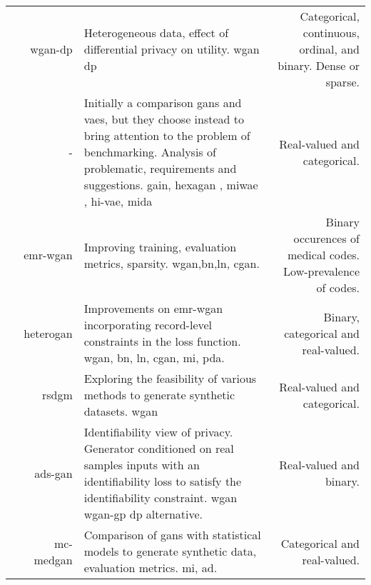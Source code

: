 \begin{center}
\begin{longtable}[l]{@{}p{}NMR@{}}
        \citeauthor{chincheong2020generation} & \gls{wgan-dp}
        & Heterogeneous data, effect of differential privacy on utility.   \gls{wgan} \gls{dp}
        & Categorical, continuous,  ordinal, and binary. Dense or sparse.\\
        
        \citeauthor{Camino2020bench} & - & Initially a comparison \glspl{gan} and \glspl{vae}, but they choose instead to bring attention to the problem of benchmarking. Analysis of problematic,  requirements and suggestions. \gls{gain}, \gls{hexagan} \cite{hwang2019exagan}, \gls{miwae} \cite{mattei2019miwae}, \gls{hi-vae}\cite{nazabal2020handling}, \gls{mida} \cite{Gondara2017} & Real-valued and categorical.\\
        
        \citeauthor{Zhang2020} & \gls{emr-wgan}
        & Improving training, evaluation metrics, sparsity.  \gls{wgan},\gls{bn},\gls{ln}, \gls{cgan}.
        & Binary occurences of medical codes. Low-prevalence of codes. \\
        
        \citeauthor{yan2020generating} & \gls{heterogan}
        & Improvements on \gls{emr-wgan} incorporating record-level constraints in the loss function.   \gls{wgan}, \gls{bn}, \gls{ln}, \gls{cgan}, \gls{mi}, \gls{pda}.
        & Binary, categorical and real-valued.\\
        
        \citeauthor{ozyigit2020generation} & \gls{rsdgm}
        & Exploring the feasibility of various methods to generate synthetic datasets.   \gls{wgan}
        & Real-valued and categorical.\\
        
        \citeauthor{Yoon2020-anon} & \gls{ads-gan}
        & Identifiability view of privacy. Generator conditioned on real samples inputs with an identifiability loss to satisfy the identifiability constraint.   \gls{wgan} \gls{wgan-gp} \gls{dp} alternative.
        & Real-valued and binary.\\
        
        \citeauthor{Goncalves2020} & \gls{mc-medgan}
        & Comparison of \glspl{gan} with statistical models to generate synthetic data, evaluation metrics.   \gls{mi}, \gls{ad}.
        & Categorical and real-valued.\\
           
        \hline
        
    \end{longtable}
\end{center}
